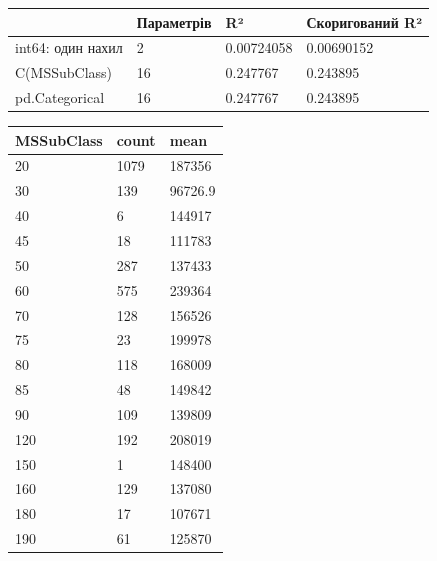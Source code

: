 
\Needspace{19.2pt}


\begingroup\fontsize{7.5}{9.5}\selectfont\setlength{\tabcolsep}{2.5mm}\renewcommand{\arraystretch}{1.15}
\par\vspace{2pt}\noindent\begin{tabular}{|llll|}
\hline
 & Параметрів & R² & Скоригований R² \\
\hline
int64: один нахил & 2 & 0.00724058 & 0.00690152 \\
C(MSSubClass) & 16 & 0.247767 & 0.243895 \\
pd.Categorical & 16 & 0.247767 & 0.243895 \\
\hline
\end{tabular}\par\vspace{2pt}
\endgroup


\Needspace{37.599999999999994pt}


\begingroup\fontsize{7.5}{9.5}\selectfont\setlength{\tabcolsep}{2.5mm}\renewcommand{\arraystretch}{1.15}
\par\vspace{2pt}\noindent\begin{tabular}{|lll|}
\hline
MSSub\allowbreak{}Class & count & mean \\
\hline
20 & 1079 & 187356 \\
30 & 139 & 96726.9 \\
40 & 6 & 144917 \\
45 & 18 & 111783 \\
50 & 287 & 137433 \\
60 & 575 & 239364 \\
70 & 128 & 156526 \\
75 & 23 & 199978 \\
80 & 118 & 168009 \\
85 & 48 & 149842 \\
90 & 109 & 139809 \\
120 & 192 & 208019 \\
150 & 1 & 148400 \\
160 & 129 & 137080 \\
180 & 17 & 107671 \\
190 & 61 & 125870 \\
\hline
\end{tabular}\par\vspace{2pt}
\endgroup


